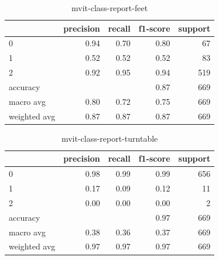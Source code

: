 \begin{table}[h!]
    \begin{tabular}{|l|r|r|r|r|}
                \hline & precision &   recall & f1-score &  support \\ \hline
                0 &      0.94 &      0.70 &      0.80 &        67 \\
                1 &      0.52 &      0.52 &      0.52 &        83 \\
                2 &      0.92 &      0.95 &      0.94 &       519 \\
         accuracy &           &           &      0.87 &       669 \\ \hline
        macro avg &      0.80 &      0.72 &      0.75 &       669 \\
     weighted avg &      0.87 &      0.87 &      0.87 &       669 \\
         \hline
    \end{tabular}
    \caption{mvit-class-report-feet}
    \label{tbl:mvit-class-report-feet}
\end{table}

\begin{table}[h!]
    \begin{tabular}{|l|r|r|r|r|}
                \hline & precision &   recall & f1-score &  support \\ \hline
                0 &      0.98 &     0.99 &     0.99 &      656 \\
                1 &      0.17 &     0.09 &     0.12 &       11 \\
                2 &      0.00 &     0.00 &     0.00 &        2 \\ \hline
         accuracy &           &          &     0.97 &      669 \\
        macro avg &      0.38 &     0.36 &     0.37 &      669 \\
     weighted avg &      0.97 &     0.97 &     0.97 &      669 \\
         \hline
    \end{tabular}
    \caption{mvit-class-report-turntable}
    \label{tbl:mvit-class-report-turntable}
\end{table}


